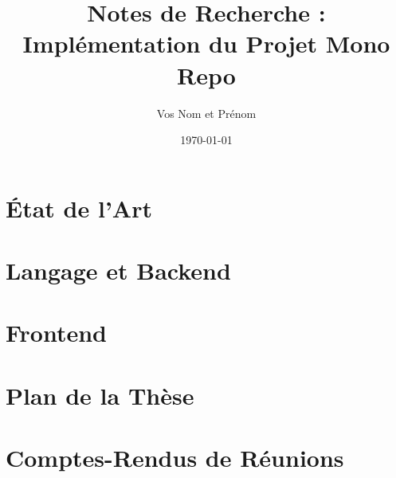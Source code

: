 \documentclass[12pt,a4paper]{article}
\title{Notes de Recherche : Implémentation du Projet Mono Repo}
\author{Vos Nom et Prénom}
\date{\today}
\begin{document}
\maketitle
\tableofcontents
\newpage

\section{État de l'Art}


\section{Langage et Backend}


\section{Frontend}


\section{Plan de la Thèse}


\section{Comptes-Rendus de Réunions}

\end{document}
